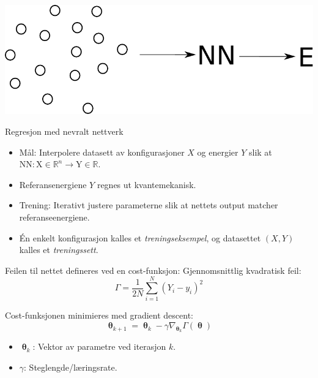 \documentclass{beamer}
\begin{document}
\begin{frame}
 
\centering
\includegraphics[width=0.8\linewidth]{../Figures/Presentation/interpolation.pdf}
\begin{block}{Regresjon med nevralt nettverk}
 \begin{itemize}
  \item Mål: Interpolere datasett av konfigurasjoner $X$ og energier $Y$ slik at
        $\mathrm{NN}: \mathrm{X} \in \mathbb{R}^n \rightarrow \mathrm{Y} \in \mathbb{R}$.
  \item Referansenergiene $Y$ regnes ut kvantemekanisk. 
  \item Trening: Iterativt justere parameterne slik at nettets output matcher referanseenergiene.
  \item Én enkelt konfigurasjon kalles et \textit{treningseksempel}, og datasettet $(X,Y)$ kalles et \textit{treningssett}. 
 \end{itemize}
\end{block}

\end{frame}


\begin{frame}
 
\begin{block}{Feilen til nettet defineres ved en cost-funksjon:} 
 Gjennomsnittlig kvadratisk feil:
 \begin{equation*}
 \Gamma = \frac{1}{2N}\sum_{i=1}^N (Y_i - y_i)^2
 \end{equation*}
\end{block}

\begin{block}{Cost-funksjonen minimieres med gradient descent:}
 \begin{equation*}
  \boldsymbol{\uptheta}_{k+1} = \boldsymbol{\uptheta}_{k} - \gamma \nabla_{\boldsymbol{\uptheta}_k} \Gamma(\boldsymbol{\uptheta})
 \end{equation*}
 \begin{itemize}
  \item $\boldsymbol{\uptheta}_{k}$: Vektor av parametre ved iterasjon $k$. 
  \item $\gamma$: Steglengde/læringsrate. 
 \end{itemize}
\end{block}

\end{frame}
\end{document}
